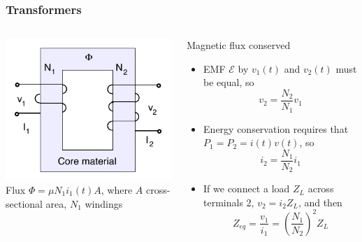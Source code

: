 \documentclass[beamer]{standalone}
\begin{document}
\begin{frame}
 \frametitle{Transformers}
 \begin{columns}
  \begin{column}{0.4\textwidth}
   \includegraphics[width=\textwidth]{pics/transformers} \\
   Flux $\Phi = \mu N_1 i_1(t) A$, where $A$ cross-sectional area, $N_1$ windings
  \end{column}
  \begin{column}{0.6\textwidth}
   \begin{block}{Magnetic flux conserved}
    \begin{itemize}
     \item EMF $\mathcal{E}$ by $v_1(t)$ and $v_2(t)$ must be equal, so
      \begin{equation*}
       v_2 = \frac{N_2}{N_1} v_1
      \end{equation*}
     \item Energy conservation requires that $P_1 = P_2 = i(t) v(t)$, so
      \begin{equation*}
       i_2 = \frac{N_1}{N_2} i_1
      \end{equation*}
     \item If we connect a load $Z_L$ across terminals 2, $v_2 = i_2 Z_L$, and then
      \begin{equation*}
       Z_{eq} = \frac{v_1}{i_1} = \left(\frac{N_1}{N_2}\right)^2 Z_L
      \end{equation*}
    \end{itemize}
   \end{block}
  \end{column}
 \end{columns}
\end{frame}
\end{document}
